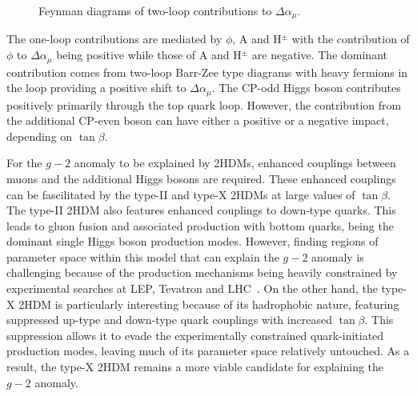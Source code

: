 \begin{figure}[h]
    \centering
    \begin{subfigure}{0.45\textwidth}
        \centering
        
    \end{subfigure}
    \hfill
    \begin{subfigure}{0.45\textwidth}
        \centering
        
    \end{subfigure}
    
    \vspace{0.5cm}

    \begin{subfigure}{0.45\textwidth}
        \centering
        
    \end{subfigure}

    \caption{Feynman diagrams of two-loop contributions to $\Delta\alpha_\mu$.}
    \label{Figure:Chapter2_TwoBarrZee}
\end{figure}


The one-loop contributions are mediated by $\phi$, A and H$^{\pm}$ with the contribution of $\phi$ to $\Delta\alpha_\mu$ being positive while those of A and H$^{\pm}$ are negative. The dominant contribution comes from two-loop Barr-Zee type diagrams with heavy fermions in the loop providing a positive shift to $\Delta\alpha_\mu$. The CP-odd Higgs boson contributes positively primarily through the top quark loop. However, the contribution from the additional CP-even boson can have either a positive or a negative impact, depending on $\tan{\beta}$. 

For the $g-2$ anomaly to be explained by 2HDMs, enhanced couplings between muons and the additional Higgs bosons are required. These enhanced couplings can be fascilitated by the type-II and type-X 2HDMs at large values of $\tan{\beta}$. The type-II 2HDM also features enhanced couplings to down-type quarks. This leads to gluon fusion and associated production with bottom quarks, being the dominant single Higgs boson production modes. However, finding regions of parameter space within this model that can explain the $g-2$ anomaly is challenging because of the production mechanisms being heavily constrained by experimental searches at LEP, Tevatron and LHC~\cite{TypeX_2HDM}. On the other hand, the type-X 2HDM is particularly interesting because of its hadrophobic nature, featuring suppressed up-type and down-type quark couplings with increased $\tan{\beta}$. This suppression allows it to evade the experimentally constrained quark-initiated production modes, leaving much of its parameter space relatively untouched. As a result, the type-X 2HDM remains a more viable candidate for explaining the $g-2$ anomaly. 

